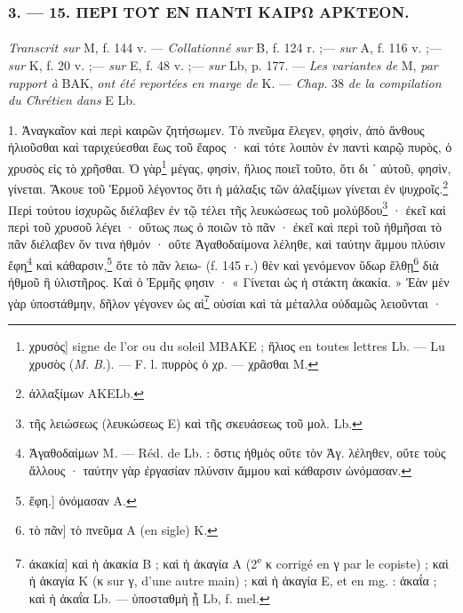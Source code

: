 \documentclass[a4paper, 11pt, oneside, polutonikogreek, french]{article}
\begin{document}
\bigskip
\centerline{\EightStarTaper}
\centerline{\EightStarTaper\EightStarTaper}
\bigskip

\subsubsection{3. --- 15. ΠΕΡΙ ΤΟΥ ΕΝ ΠΑΝΤΙ ΚΑΙΡΩ ΑΡΚΤΕΟΝ.}
\paragraph{}
\emph{Transcrit sur} M, f. 144 v. --- \emph{Collationné sur} B, f. 124 r. ;--- \emph{sur} A, f. 116 v. ;--- \emph{sur} K, f. 20 v. ;--- \emph{sur} E, f. 48 v. ;--- \emph{sur} Lb, p. 177. --- \emph{Les variantes de} M, \emph{par rapport à} BAK, \emph{ont été reportées en marge de} K. --- \emph{Chap.} 38 \emph{de la compilation du Chrétien dans} E Lb.

\bigskip

1. Ἀναγκαῖον καὶ περὶ καιρῶν ζητήσωμεν. Τὸ πνεῦμα ἔλεγεν, φησὶν, ἀπὸ ἄνθους ἡλιοῦσθαι καὶ ταριχεύεσθαι ἕως τοῦ ἔαρος · καὶ τότε λοιπὸν ἐν παντὶ καιρῷ πυρὸς, ὁ χρυσὸς εἰς τὸ χρῆσθαι. Ὁ γὰρ\footnote{χρυσὸς] signe de l'or ou du soleil MBAKE ; ἥλιος en toutes lettres Lb. --- Lu χρυσὸς (\emph{M. B.}). --- F. l. πυρρὸς ὁ χρ. --- χρᾶσθαι M.} μέγας, φησὶν, ἥλιος ποιεῖ τοῦτο, ὅτι δι ᾽ αὐτοῦ, φησὶν, γίνεται. Ἄκουε τοῦ Ἑρμοῦ λέγοντος ὅτι ἡ μάλαξις τῶν ἀλαξίμων γίνεται ἐν ψυχροῖς.\footnote{ἀλλαξίμων AKELb.} Περὶ τούτου ἰσχυρῶς διέλαβεν ἐν τῷ τέλει τῆς λευκώσεως τοῦ μολύβδου\footnote{τῆς λειώσεως (λευκώσεως E) καὶ τῆς σκευάσεως τοῦ μολ. Lb.} · ἐκεῖ καὶ περὶ τοῦ χρυσοῦ λέγει · οὕτως πως ὁ ποιῶν τὸ πᾶν · ἐκεῖ καὶ περὶ τοῦ ἠθμῆσαι τὸ πᾶν διέλαβεν ὅν τινα ἠθμόν · οὔτε Ἀγαθοδαίμονα λέληθε, καὶ ταύτην ἄμμου πλύσιν ἔφη\footnote{Ἀγαθοδαίμων M. --- Réd. de Lb. : ὅστις ἡθμὸς οὔτε τὸν Ἀγ. λέληθεν, οὔτε τοὺς ἄλλους · ταύτην γὰρ ἐργασίαν πλύνσιν ἄμμου καὶ κάθαρσιν ὠνόμασαν.} καὶ κάθαρσιν,\footnote{ἔφη.] ὀνόμασαν A.} ὅτε τὸ πᾶν λειω- (f. 145 r.) θὲν καὶ γενόμενον ὕδωρ ἔλθῃ\footnote{τὸ πᾶν] τὸ πνεῦμα A (en sigle) K.} διὰ ἠθμοῦ ἢ ὑλιστῆρος. Καὶ ὁ Ἑρμῆς φησιν · « Γίνεται ὡς ἡ στάκτη ἀκακία. » Ἐὰν μὲν γὰρ ὑποστάθμην, δῆλον γέγονεν ὡς αἱ\footnote{ἀκακία] καὶ ἡ ἀκακία B ; καὶ ἡ ἀκαγία A (2\textsuperscript{e} κ corrigé en γ par le copiste) ; καὶ ἡ ἀκαγία K (κ sur γ, d'une autre main) ; καὶ ἡ ἀκαγία E, et en mg. : ἀκαΐα ; καὶ ἡ ἀκαΐα Lb. --- ὑποσταθμὴ ᾖ Lb, f. mel.} οὐσίαι καὶ τὰ μέταλλα οὐδαμῶς λειοῦνται ·
\end{document}
